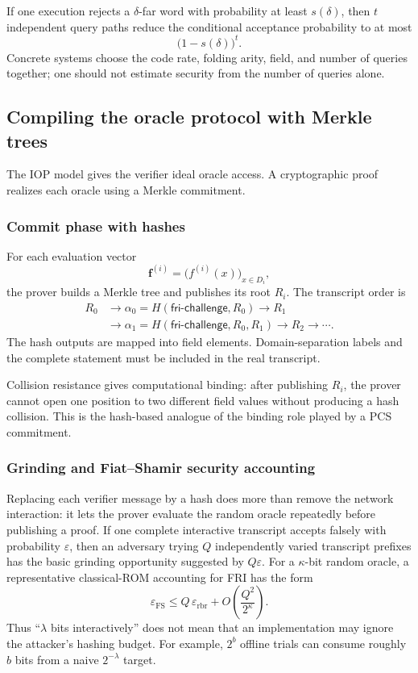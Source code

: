 If one execution rejects a $\delta$-far word with probability at least $s(\delta)$, then $t$
independent query paths reduce the conditional acceptance probability to at most
\[
    \bigl(1-s(\delta)\bigr)^t.
\]
Concrete systems choose the code rate, folding arity, field, and number of queries together;
one should not estimate security from the number of queries alone.

\subsection{Compiling the oracle protocol with Merkle trees}

The IOP model gives the verifier ideal oracle access. A cryptographic proof realizes each
oracle using a Merkle commitment.

\subsubsection*{Commit phase with hashes}

For each evaluation vector
\[
    \mathbf f^{(i)}=\bigl(f^{(i)}(x)\bigr)_{x\in D_i},
\]
the prover builds a Merkle tree and publishes its root $R_i$. The transcript order is
\[
\begin{aligned}
R_0
&\longrightarrow \alpha_0=H(\mathsf{fri\mbox{-}challenge},R_0)\longrightarrow R_1\\
&\longrightarrow \alpha_1=H(\mathsf{fri\mbox{-}challenge},R_0,R_1)\longrightarrow R_2
\longrightarrow\cdots.
\end{aligned}
\]
The hash outputs are mapped into field elements. Domain-separation labels and the complete
statement must be included in the real transcript.

Collision resistance gives computational binding: after publishing $R_i$, the prover cannot
open one position to two different field values without producing a hash collision. This is
the hash-based analogue of the binding role played by a PCS commitment.

\subsubsection*{Grinding and Fiat--Shamir security accounting}

Replacing each verifier message by a hash does more than remove the network interaction: it
lets the prover evaluate the random oracle repeatedly before publishing a proof. If one complete
interactive transcript accepts falsely with probability $\varepsilon$, then an adversary trying
$Q$ independently varied transcript prefixes has the basic grinding opportunity suggested by
$Q\varepsilon$. For a $\kappa$-bit random oracle, a representative classical-ROM accounting for
FRI has the form~\cite{BlockGarretaKatzThalerTiwariZajac2023FRIFS}
\[
    \varepsilon_{\mathrm{FS}}
    \le
    Q\,\varepsilon_{\mathrm{rbr}}
    +O\!\left(\frac{Q^2}{2^\kappa}\right).
\]
Thus ``$\lambda$ bits interactively'' does not mean that an implementation may ignore the
attacker's hashing budget. For example, $2^b$ offline trials can consume roughly $b$ bits from
a naive $2^{-\lambda}$ target.

